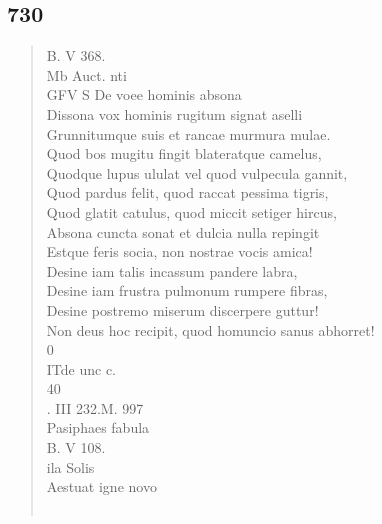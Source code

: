 \documentclass[11pt, a4paper]{report}
\begin{document}
            \subsection*{730}
      \begin{verse}
      B. V 368. \\ Mb Auct. nti \\ GFV S De voee hominis absona \\ Dissona vox hominis rugitum signat aselli \\ Grunnitumque suis et rancae murmura mulae. \\ Quod bos mugitu fingit blateratque camelus, \\ Quodque lupus ululat vel quod vulpecula gannit, \\ Quod pardus felit, quod raccat pessima tigris, \\ Quod glatit catulus, quod miccit setiger hircus, \\ Absona cuncta sonat et dulcia nulla repingit \\ Estque feris socia, non nostrae vocis amica! \\ Desine iam talis incassum pandere labra, \\ Desine iam frustra pulmonum rumpere fibras, \\ Desine postremo miserum discerpere guttur! \\ Non deus hoc recipit, quod homuncio sanus abhorret! \\ 0 \\ ITde unc c. \\ 40 \\ . III 232.M. 997 \\ Pasiphaes fabula \\ B. V 108. \\ ila  \lbrack  Solis \rbrack  \\ Aestuat igne novo  \rbrack  \\ 
        ﻿\pagebreak 

\end{verse}
\end{document}
